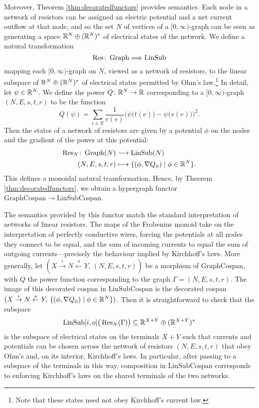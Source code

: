 Moreover, Theorem \ref{thm:decoratedfunctors} provides semantics. Each node in a
network of resistors can be assigned an electric potential and a net current
outflow at that node, and so the set $N$ of vertices of a $[0,\infty)$-graph can
be seen as generating a space ${\mathbb{R}}^N \oplus ({\mathbb{R}}^N)^\ast$ of electrical states of
the network. We define a natural transformation 
\[
  \operatorname{Res}\colon  \operatorname{Graph} \Longrightarrow \operatorname{LinSub}
\]
mapping each $[0,\infty)$-graph on $N$, viewed as a network of resistors, to the
linear subspace of ${\mathbb{R}}^N \oplus ({\mathbb{R}}^N)^\ast$ of electrical states permitted by
Ohm's law.\footnote{Note that these states need not obey Kirchhoff's current
law.} In detail, let $\psi \in {\mathbb{R}}^N$. We define the power $Q\colon  {\mathbb{R}}^N \to {\mathbb{R}}$
corresponding to a $[0,\infty)$-graph $(N,E,s,t,r)$ to be the function
\[
  Q(\psi) = \sum_{e \in E} \frac1{r(e)}
  \Big(\psi\big(t(e)\big)-\psi\big(s(e)\big)\Big)^2.
\]
Then the states of a network of resistors are given by a potential $\phi$ on the
nodes and the gradient of the power at this potential:
\begin{align*}
  \operatorname{Res}_N\colon  \operatorname{Graph}(N) &\longrightarrow \operatorname{LinSub}(N)\\
  (N,E,s,t,r) &\longmapsto \{(\phi,\nabla Q_\phi) \mid \phi \in {\mathbb{R}}^N\}.
\end{align*}
This defines a monoidal natural transformation. Hence, by Theorem
\ref{thm:decoratedfunctors}, we obtain a hypergraph functor
$\mathrm{GraphCospan} \to \mathrm{LinSubCospan}$. 

The semantics provided by this functor match the standard interpretation of
networks of linear resistors. The maps of the Frobenius monoid take on the
interpretation of perfectly conductive wires, forcing the potentials at all
nodes they connect to be equal, and the sum of incoming currents to equal the
sum of outgoing currents---precisely the behaviour implied by Kirchhoff's laws.
More generally, let $(X \stackrel{i}{\rightarrow} N
\stackrel{o}{\leftarrow} Y, \, (N,E,s,t,r))$ be a morphism of
$\mathrm{GraphCospan}$, with $Q$ the power function corresponding to the graph
$\Gamma = (N,E,s,t,r)$. The image of this decorated cospan in
$\mathrm{LinSubCospan}$ is the decorated cospan $(X \stackrel{i}{\rightarrow} N
\stackrel{o}{\leftarrow} Y, \, \{(\phi,\nabla Q_\phi) \mid \phi \in {\mathbb{R}}^N\})$.
Then it is straightforward to check that the subspace 
\[
  \operatorname{LinSub}[i,o]\big(\operatorname{Res}_N(\Gamma)\big)\subseteq {\mathbb{R}}^{X+Y} \oplus ({\mathbb{R}}^{X+Y})^\ast
\]
is the subspace of electrical states on the terminals $X+Y$ such that currents
and potentials can be chosen across the network of resistors $(N,E,s,t,r)$ that
obey Ohm's and, on its interior, Kirchhoff's laws. In particular, after passing
to a subspace of the terminals in this way, composition in
$\mathrm{LinSubCospan}$ corresponds to enforcing Kirchhoff's laws on the shared
terminals of the two networks. 

